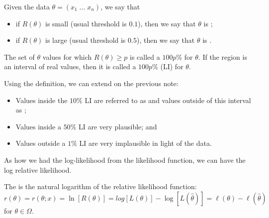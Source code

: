 \documentclass[notoc,notitlepage]{tufte-book}
\begin{document}
\begin{note}
  Given the data $\theta = (x_1 \; ... \; x_n)$, we say that
  \begin{itemize}
    \item if $R(\theta)$ is small (usual threshold is $0.1$), then we say that $\theta$ is ;
    \item if $R(\theta)$ is large (usual threshold is $0.5$), then we say that $\theta$ is .
  \end{itemize}
\end{note}

\begin{defn}
\label{defn:likelihood_region_n_likelihood_interval}
  The set of $\theta$ values for which $R(\theta) \geq p$ is called a $100p \%$  for $\theta$. If the region is an interval of real values, then it is called a $100p\%$  (LI) for $\theta$.
\end{defn}

\begin{note}
  Using the definition, we can extend on the previous note:
  \begin{itemize}
    \item Values inside the $10\%$ LI are referred to as  and values outside of this interval as ;
    \item Values inside a $50\%$ LI are very plausible; and
    \item Values outside a $1\%$ LI are very implausible in light of the data.
  \end{itemize}
\end{note}

As how we had the log-likelihood from the likelihood function, we can have the log relative likelihood.

\begin{defn}
\label{defn:log_relative_likelihood}
  The  is the natural logarithm of the relative likelihood function:
  \begin{equation*}
    r(\theta) = r(\theta ; x) = \ln [ R(\theta) ] = log[ L(\theta) ] - \log[ L(\hat{\theta}) ] = \ell(\theta) - \ell(\hat{\theta})
  \end{equation*}
  for $\theta \in \Omega$.
\end{defn}
\end{document}
